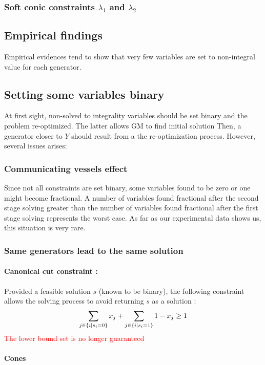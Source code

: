\subsubsection*{Soft conic constraints $\lambda_1$ and $\lambda_2$}



\subsection{Empirical findings}
Empirical evidences tend to show that very few variables are set to non-integral value for each generator.

\subsection{Setting some variables binary}
At first sight, non-solved to integrality variables should be set binary and the problem re-optimized. The latter allows GM to find initial solution Then, a generator closer to $Y$ should result from a the re-optimization process. However, several issues arises:

\subsubsection{Communicating vessels effect}
Since not all constraints are set binary, some variables found to be zero or one might become fractional. 
A number of variables found fractional after the second stage solving greater than the number of variables found fractional after the first stage solving represents the worst case. 
As far as our experimental data shows us, this situation is very rare.
\subsubsection{Same generators lead to the same solution}
\paragraph{Canonical cut constraint :}
Provided a feasible solution $s$ (known to be binary), the following constraint allows the solving process to avoid returning $s$ as a solution \cite{canonical_cut}:
\[
\sum_{j \in \left\lbrace i \mid s_i = 0 \right\rbrace}x_j +  \sum_{j \in \left\lbrace i \mid s_i = 1 \right\rbrace}1-x_j \geq 1
\]
\textcolor{red}{The lower bound set is no longer guaranteed}
\paragraph{Cones}

